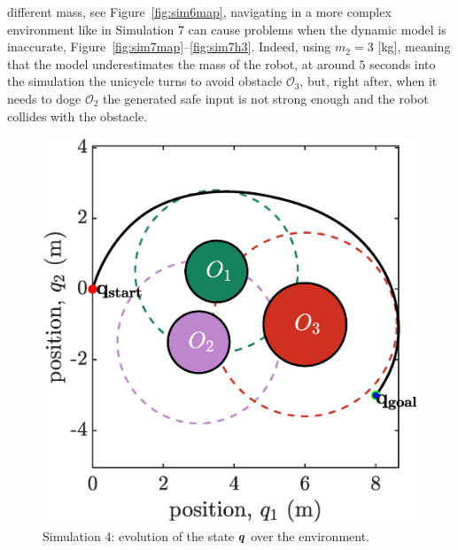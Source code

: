 different mass, see Figure~\ref{fig:sim6map}, navigating in a more complex environment like in Simulation 7 can cause problems when the dynamic model is inaccurate, Figure~\ref{fig:sim7map}--\ref{fig:sim7h3}. Indeed, using $m_2=3$ [kg], meaning that the model underestimates the mass of the robot, at around $5$ seconds into the simulation the unicycle turns to avoid obstacle $\mathcal{O}_3$, but, right after, when it needs to doge $\mathcal{O}_2$ the generated safe input is not strong enough and the robot collides with the obstacle.
\begin{figure}[!ht]
    \begin{minipage}[b]{0.46\linewidth}
    \includegraphics[width=\textwidth]{figures/sim4map.eps}
    \caption{\label{fig:sim4map}Simulation 4: evolution of the state ${\boldsymbol{q}}$ over the environment.}
    \end{minipage}
    \hfill
    \begin{minipage}[b]{0.46\linewidth}

\end{minipage}
\end{figure}
